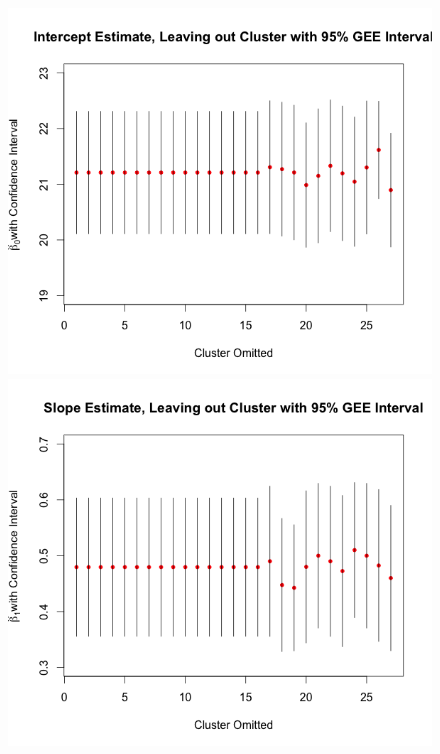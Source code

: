 \documentclass[11pt]{article}
\begin{document}
\begin{enumerate}
\begin{figure}[H]
			\includegraphics[scale=0.4]{RplotDDExchGEEBeta0.png}
			\includegraphics[scale=0.4]{RplotDDExchGEEBeta1.png}

\end{figure}
\end{enumerate}
\end{document}
